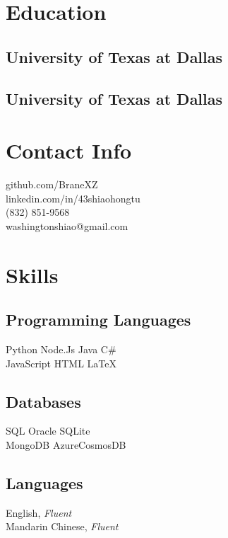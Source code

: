 \documentclass{fortythree_resume}
\begin{document}
\sectionsep

\begin{minipage}[t]{0.33\textwidth}

\section{Education}
\subsection{University of Texas at Dallas}
\subsection{University of Texas at Dallas}
\sectionsep

\section{Contact Info}
\faGithub \hspace{0em} github.com/BraneXZ\\
\faLinkedinSquare \hspace{0em} linkedin.com/in/43shiaohongtu\\
\faMobile \hspace{0em} (832) 851-9568\\
\faEnvelope \hspace{0em} washingtonshiao@gmail.com
\sectionsep

\section{Skills}
\subsection{Programming Languages}
Python \textbullet{} Node.Js \textbullet{} Java \textbullet{} C\# \\
JavaScript \textbullet{} HTML \textbullet{} \LaTeX
\subsection{Databases}
SQL \textbullet{} Oracle \textbullet{} SQLite\\ 
MongoDB \textbullet{} AzureCosmosDB
\subsection{Languages}
English, \emph{Fluent}\\
Mandarin Chinese, \emph{Fluent}\\
\sectionsep


\end{minipage}
\end{document}
